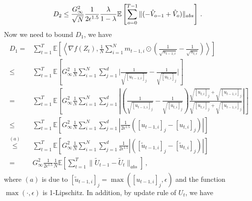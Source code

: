\documentclass{article} %
\begin{document}
\begin{equation}\notag
D_2 \leq  \frac{G_{\infty}^2}{\sqrt{N}}\frac{1}{2\epsilon^{1.5}} \frac{\lambda}{1-\lambda}   \mathbb E \left[ \sum_{o=0}^{T-1}     \|    (- \hat V_{o-1} + \hat V_{o} ) \|_{abs} \right]  \, .
\end{equation}
Now we need to bound $D_1$, we have
\begin{align}\label{eq: T_1}
\begin{split}
D_1 = & \sum_{t=1}^T   \mathbb E \left [\left \langle \nabla f( Z_{t}) , \frac{1}{N} \sum_{i=1}^N m_{t-1	,i} \odot (\frac{1}{\sqrt{u_{t-1,i}}} - \frac{1}{\sqrt{u_{t,i}}}) \right \rangle \right]  \\
\leq & \sum_{t=1}^T   \mathbb E \left [   G_{\infty}^2 \frac{1}{N} \sum_{i=1}^N \sum_{j=1}^d \bigg|\frac{1}{\sqrt{[u_{t-1,i}]_j}} - \frac{1}{\sqrt{[u_{t,i}]_j}}\bigg|   \right]  \\
= & \sum_{t=1}^T   \mathbb E \left [   G_{\infty}^2 \frac{1}{N} \sum_{i=1}^N \sum_{j=1}^d \left|\left(\frac{1}{\sqrt{[u_{t-1,i}]_j}} - \frac{1}{\sqrt{[u_{t,i}]_j}}\right) \frac{\sqrt{[u_{t,i}]_j}+\sqrt{[u_{t-1,i}]_j}}{\sqrt{[u_{t,i}]_j}+\sqrt{[u_{t-1,i}]_j}}\right|    \right]  \\
\leq & \sum_{t=1}^T   \mathbb E \left [   G_{\infty}^2 \frac{1}{N} \sum_{i=1}^N \sum_{j=1}^d \left|\frac{1}{2\epsilon^{1.5}}\left({{[u_{t-1,i}]_j}} - {{[u_{t,i}]_j}}\right) \right|    \right]  \\
\overset{(a)}{\leq} & \sum_{t=1}^T   \mathbb E \left [   G_{\infty}^2 \frac{1}{N} \sum_{i=1}^N \sum_{j=1}^d\frac{1}{2\epsilon^{1.5}} \left|\left({{[\tilde u_{t-1,i}]_j}} - {{[\tilde u_{t,i}]_j}}\right) \right|    \right]  \\
= &  G_{\infty}^2 \frac{1}{2\epsilon^{1.5}} \frac{1}{N}   \mathbb E \left [  \sum_{t=1}^T   \|{{\tilde U_{t-1}}} - {{\tilde U_{t}}\|_{abs}}    \right] \, ,  
\end{split}
\end{align}
where $(a)$ is due to $[\tilde u_{t-1,i}]_j = \max ([u_{t-1,i}]_j,\epsilon)$ and the function $\max(\cdot,\epsilon)$ is 1-Lipschitz.
In addition, by update rule of $U_t$, we have 
\end{document}
